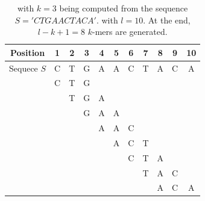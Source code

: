 \begin{table}
	\centering
	\begin{tabular}{ c c c c c c c c c c c}
		\toprule
		Position & 1 & 2 & 3 & 4 & 5 & 6 & 7 & 8 & 9 & 10 \\
		\midrule
		Sequece $S$ & C & T & G & A & A & C & T &A & C & A\\
		\midrule 
		\kmers & C & T & G  \\
		&   & T & G & A \\
		&   &  & G & A & A \\
		&   &  &  & A & A & C\\
		&   &  &  &  & A & C & T\\
		&   &  &  &  &  & C & T & A \\
		&   &  &  &  &  &  & T & A & C \\
		&   &  &  &  &  & & & A & C & A\\
		
		\bottomrule
	\end{tabular}
	\caption{\kmers with $k=3$ being computed from the sequence $S= 'CTGAACTACA'$. with $l=10$. At the end, $l-k +1 = 8$ $k$-mers are generated.}
	\label{tab-kmers}
\end{table}

